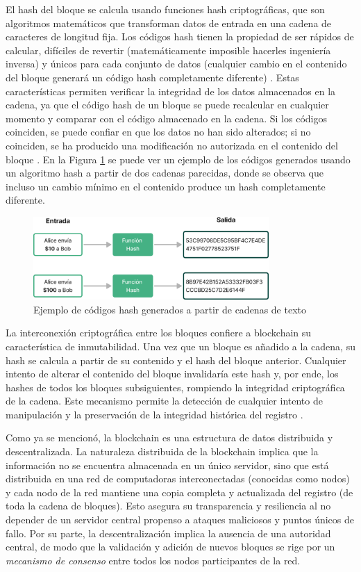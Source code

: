 El hash del bloque se calcula usando funciones hash criptográficas, que son algoritmos matemáticos que transforman datos de entrada en una cadena de caracteres de longitud fija. Los códigos hash tienen la propiedad de ser rápidos de calcular, difíciles de revertir (matemáticamente imposible hacerles ingeniería inversa) y únicos para cada conjunto de datos (cualquier cambio en el contenido del bloque generará un código hash completamente diferente) \cite{pending}. Estas características permiten verificar la integridad de los datos almacenados en la cadena, ya que el código hash de un bloque se puede recalcular en cualquier momento y comparar con el código almacenado en la cadena. Si los códigos coinciden, se puede confiar en que los datos no han sido alterados; si no coinciden, se ha producido una modificación no autorizada en el contenido del bloque \cite{pending}. En la Figura \ref{fig:hash-example} se puede ver un ejemplo de los códigos generados usando un algoritmo hash a partir de dos cadenas parecidas, donde se observa que incluso un cambio mínimo en el contenido produce un hash completamente diferente. 

\begin{figure}[!tb]
    \centering
    \includegraphics[width=0.8\textwidth]{Figures/hash-example.png}
    \caption{Ejemplo de códigos hash generados a partir de cadenas de texto}
    \label{fig:hash-example}
\end{figure}

La interconexión criptográfica entre los bloques confiere a blockchain su característica de inmutabilidad. Una vez que un bloque es añadido a la cadena, su hash se calcula a partir de su contenido y el hash del bloque anterior. Cualquier intento de alterar el contenido del bloque invalidaría este hash y, por ende, los hashes de todos los bloques subsiguientes, rompiendo la integridad criptográfica de la cadena. Este mecanismo permite la detección de cualquier intento de manipulación y la preservación de la integridad histórica del registro \cite{bulkowska2023implementation}. 

Como ya se mencionó, la blockchain es una estructura de datos distribuida y descentralizada. La naturaleza distribuida de la blockchain implica que la información no se encuentra almacenada en un único servidor, sino que está distribuida en una red de computadoras interconectadas (conocidas como nodos) y cada nodo de la red mantiene una copia completa y actualizada del registro (de toda la cadena de bloques). Esto asegura su transparencia y resiliencia al no depender de un servidor central \cite{bulkowska2023implementation} propenso a ataques maliciosos y puntos únicos de fallo. Por su parte, la descentralización implica la ausencia de una autoridad central, de modo que la validación y adición de nuevos bloques se rige por un \textit{mecanismo de consenso} entre todos los nodos participantes de la red. 

